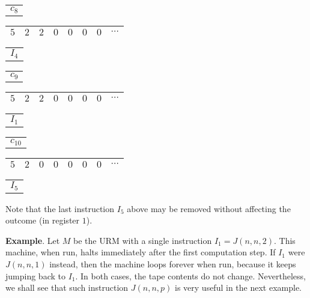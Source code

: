 \documentclass[12pt]{article}
\begin{document}
\vspace{-0.75cm}
\begin{center}
\begin{tabular}{ p{0.5cm} }
$c_8$
\end{tabular}
\begin{tabular}{|c|c|c|c|c|c|c|c}
\hline
$5$ & $2$ & $2$ & $0$ & $0$ & $0$ & $0$ & $\cdots$ \\
\hline
\end{tabular}
\begin{tabular}{ p{0.5cm} }
$I_4$
\end{tabular}
\end{center}
\vspace{-0.75cm}
\begin{center}
\begin{tabular}{ p{0.5cm} }
$c_9$
\end{tabular}
\begin{tabular}{|c|c|c|c|c|c|c|c}
\hline
$5$ & $2$ & $2$ & $0$ & $0$ & $0$ & $0$ & $\cdots$ \\
\hline
\end{tabular}
\begin{tabular}{ p{0.5cm} }
$I_1$
\end{tabular}
\end{center}
\vspace{-0.75cm}
\begin{center}
\begin{tabular}{ p{0.5cm} }
$c_{10}$
\end{tabular}
\begin{tabular}{|c|c|c|c|c|c|c|c}
\hline
$5$ & $2$ & $0$ & $0$ & $0$ & $0$ & $0$ & $\cdots$ \\
\hline
\end{tabular}
\begin{tabular}{ p{0.5cm} }
$I_5$
\end{tabular}
\end{center}

Note that the last instruction $I_5$ above may be removed without affecting the outcome (in register $1$).

\textbf{Example}.  Let $M$ be the URM with a single instruction $I_1=J(n,n,2)$.  This machine, when run, halts immediately after the first computation step.  If $I_1$ were $J(n,n,1)$ instead, then the machine loops forever when run, because it keeps jumping back to $I_1$.  In both cases, the tape contents do not change.  Nevertheless, we shall see that such instruction $J(n,n,p)$ is very useful in the next example.
\end{document}

